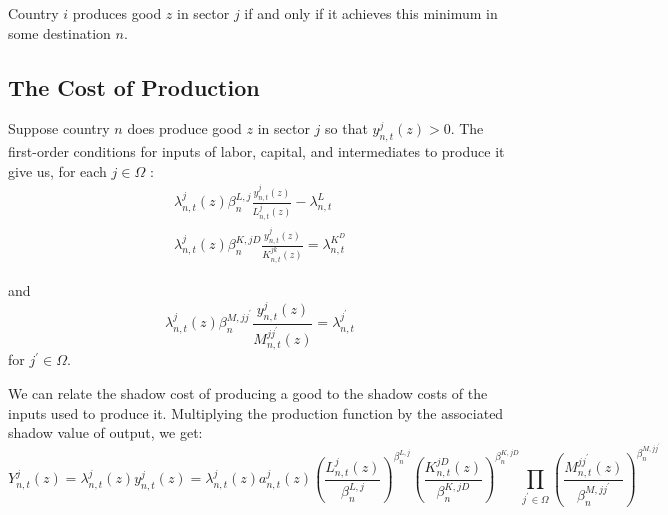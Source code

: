 \documentclass[12pt, bibtotoc, tablecaptionabove, figurecaptionabove, fleqn]{article}
\begin{document}
Country $i$ produces good $z$ in sector $j$ if and only if it achieves this minimum in some destination $n$.

\subsection{The Cost of Production}

Suppose country $n$ does produce good $z$ in sector $j$ so that $y_{n, t}^{j} (z)>0$. The first-order conditions for inputs of labor, capital, and intermediates to produce it give us, for each $j \in \Omega$ :
\begin{equation*}
	\begin{array}{c}
\lambda_{n, t}^{j}(z) \beta_{n}^{L, j} \frac{y_{n, t}^{j}(z)}{L_{n, t}^{j}(z)}-\lambda_{n, t}^{L} \\
\lambda_{n, t}^{j}(z) \beta_{n}^{K, j D} \frac{y_{n, t}^{j}(z)}{K_{n, t}^{j k}(z)}=\lambda_{n, t}^{K^{D}}
\end{array}
\end{equation*}

and
\begin{equation*}
	\lambda_{n, t}^{j}(z) \beta_{n}^{M, j j^{\prime}} \frac{y_{n, t}^{j}(z)}{M_{n, t}^{j j^{\prime}}(z)}=\lambda_{n, t}^{j^{\prime}}
\end{equation*}
for $j^{\prime} \in \Omega$.

We can relate the shadow cost of producing a good to the shadow costs of the inputs used to
produce it. Multiplying the production function by the associated shadow value of output, we
get:
\begin{equation*}
	Y_{n, t}^{j}(z)=\lambda_{n, t}^{j}(z) y_{n, t}^{j}(z)=\lambda_{n, t}^{j}(z) a_{n, t}^{j}(z)\left(\frac{L_{n, t}^{j}(z)}{\beta_{n}^{L, j}}\right)^{\beta_{n}^{L, j}} \left(\frac{K_{n, t}^{j D}(z)}{\beta_{n}^{K, j D}}\right)^{\beta_{n}^{K, j D}} \prod_{j^{\prime} \in \Omega}\left(\frac{M_{n, t}^{j j^{\prime}}(z)}{\beta_{n}^{M, j j^{\prime}}}\right)^{\beta_{n}^{M, j j^{\prime}}}
\end{equation*}
\end{document}
